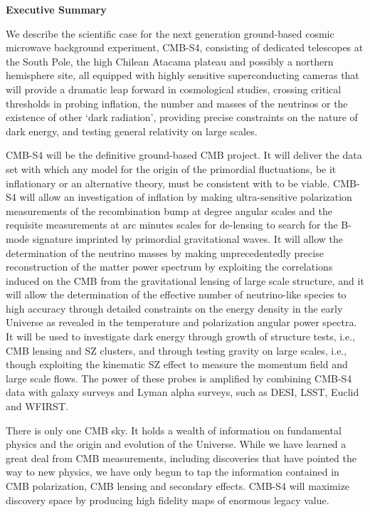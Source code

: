 \begin{center}
  {\Large \bf Executive Summary}
\end{center}

We describe the scientific case for the next generation ground-based cosmic microwave background experiment, CMB-S4, consisting of dedicated telescopes at the South Pole, the high Chilean Atacama plateau and possibly a northern hemisphere site, all equipped with highly sensitive superconducting cameras that will provide a dramatic leap forward in cosmological studies, crossing critical thresholds in probing inflation, the number and masses of the neutrinos or the existence of other `dark radiation', providing precise constraints on the nature of dark energy, and testing general relativity on large scales. 

CMB-S4 will be the definitive ground-based CMB project. It will deliver the data set with which any model for the origin of the primordial fluctuations, be it inflationary or an alternative theory, must be consistent with to be viable.  CMB-S4 will allow an investigation of inflation by making ultra-sensitive polarization measurements of the recombination bump at degree angular scales and the requisite measurements at arc minutes scales for de-lensing to search for the B-mode signature imprinted by primordial gravitational waves. It will allow the determination of the neutrino masses by making unprecedentedly precise reconstruction of the matter power spectrum by exploiting the correlations induced on the CMB from the gravitational lensing of large scale structure, and it will allow the determination of the effective number of neutrino-like species to high accuracy through detailed constraints on the energy density in the early Universe as revealed in the temperature and polarization angular power spectra.
It will be used to investigate dark energy through growth of structure tests, i.e., CMB lensing and SZ clusters, and through testing gravity on large scales, i.e., though exploiting the kinematic SZ effect to measure the momentum field and large scale flows. The power of these probes is amplified by combining CMB-S4 data with galaxy surveys and Lyman alpha surveys, such as DESI, LSST, Euclid and WFIRST.

There is only one CMB sky. It holds a wealth of information on fundamental physics and the origin and evolution of the Universe. While we have learned a great deal from CMB measurements, including discoveries that have pointed the way to new physics, we have only begun to tap the information contained in CMB polarization, CMB lensing and secondary effects. CMB-S4 will  maximize discovery space by producing high fidelity maps of enormous legacy value.

